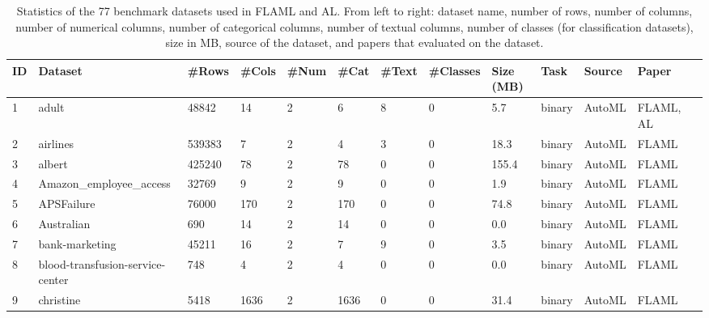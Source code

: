 \begin{table*}%
\scriptsize
\centering
\caption{Statistics of the 77 benchmark datasets used in FLAML and AL. From left to right: dataset name, number of rows, number of columns, number of numerical columns, number of categorical columns, number of textual columns, number of classes (for classification datasets), size in MB, source of the dataset, and papers that evaluated on the dataset.}
\begin{tabular}{lllllllllllll}
\toprule
\textbf{ID} & \textbf{Dataset} & \textbf{\#Rows} & \textbf{\#Cols} & \textbf{\#Num} & \textbf{\#Cat} & \textbf{\#Text} & \textbf{\#Classes}  & \textbf{Size (MB)} & \textbf{Task} & \textbf{Source} & \textbf{Paper} \\
\midrule
1   & adult                                       & 48842   & 14     & 2     & 6     & 8      & 0         & 5.7       & binary      & AutoML & FLAML, AL        \\
2   & airlines                                    & 539383  & 7      & 2     & 4     & 3      & 0         & 18.3      & binary      & AutoML & FLAML            \\
3   & albert                                      & 425240  & 78     & 2     & 78    & 0      & 0         & 155.4     & binary      & AutoML & FLAML            \\
4   & Amazon\_employee\_access                    & 32769   & 9      & 2     & 9     & 0      & 0         & 1.9       & binary      & AutoML & FLAML            \\
5   & APSFailure                                  & 76000   & 170    & 2     & 170   & 0      & 0         & 74.8      & binary      & AutoML & FLAML            \\
6   & Australian                                  & 690     & 14     & 2     & 14    & 0      & 0         & 0.0       & binary      & AutoML & FLAML            \\
7   & bank-marketing                              & 45211   & 16     & 2     & 7     & 9      & 0         & 3.5       & binary      & AutoML & FLAML            \\
8   & blood-transfusion-service-center            & 748     & 4      & 2     & 4     & 0      & 0         & 0.0       & binary      & AutoML & FLAML            \\
9   & christine                                   & 5418    & 1636   & 2     & 1636  & 0      & 0         & 31.4      & binary      & AutoML & FLAML            \\

\end{tabular}
\end{table*}
